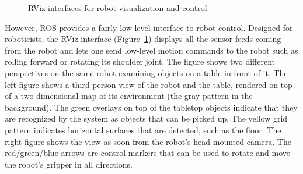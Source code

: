 \documentclass[10pt,twocolumn]{article}
\begin{document}
\begin{figure}[tbh]
\center{}
\caption{RViz interfaces for robot visualization and control}
\label{rviz}
\end{figure}

However, ROS provides a fairly low-level interface to robot control. Designed for roboticists, the RViz interface (Figure~\ref{rviz}) displays all the sensor feeds coming from the robot and lets one send low-level motion commands to the robot such as rolling forward or rotating its shoulder joint. The figure shows two different perspectives on the same robot examining objects on a table in front of it. The left figure shows a third-person view of the robot and the table, rendered on top of a two-dimensional map of its environment (the gray pattern in the background). The green overlays on top of the tabletop objects indicate that they are recognized by the system as objects that can be picked up. The yellow grid pattern indicates horizontal surfaces that are detected, such as the floor.  The right figure shows the view as soon from the robot's head-mounted camera. The red/green/blue arrows are control markers that can be used to rotate and move the robot's gripper in all directions.
\end{document}

